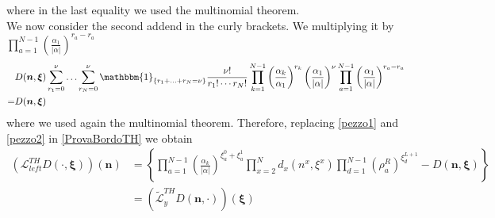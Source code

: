 \documentclass[10pt]{article}
\numberwithin{equation}{section}
\numberwithin{equation}{subsection}
\begin{document}
where in the last equality we used the multinomial theorem. \\ We now consider the second addend in the curly brackets.
We multiplying it by $\prod_{a=1}^{N-1}\left(\frac{\alpha_{1}}{|\alpha|}\right)^{r_{a}-r_{a}}$ 
\begin{equation}\label{pezzo2}
	\begin{split}
	&D(\bm{n},\bm{\xi})\sum_{r_{1}=0}^{\nu}\ldots\sum_{r_{N}=0}^{\nu}\mathbbm{1}_{\{r_{1}+\ldots+r_{N}=\nu\}}\frac{\nu!}{r_{1}!\cdots r_{N}!}\prod_{k=1}^{N-1}\left(\frac{\alpha_{k}}{\alpha_{1}}\right)^{r_{k}}\left(\frac{\alpha_{1}}{|\alpha|}\right)^{\nu}\prod_{a=1}^{N-1}\left(\frac{\alpha_{1}}{|\alpha|}\right)^{r_{a}-r_{a}}\\=&D(\bm{n},\bm{\xi})
	\end{split}
\end{equation}
where we used again the multinomial theorem. Therefore, replacing \eqref{pezzo1} and \eqref{pezzo2} in \eqref{ProvaBordoTH} we obtain 
\begin{align}
	\left(\mathcal{L}_{left}^{TH}D(\cdot,\bm{\xi})\right)(\bm{n})&=\left\{\prod_{a=1}^{N-1}\left(\frac{\alpha_{k}}{|\alpha|}\right)^{\xi_{a}^{0}+\xi_{a}^{1}}\prod_{x=2}^{N}d_{x}(n^{x},\xi^{x})\prod_{d=1}^{N-1}(\rho_{a}^{R})^{\xi_{d}^{L+1}}-D(\bm{n},\bm{\xi})\right\}
	\\&=
	\left(\widetilde{\mathcal{L}}_{y}^{TH}D(\bm{n},\cdot)\right)(\bm{\xi})
\end{align}
\end{document}
